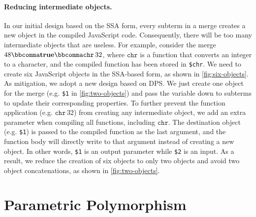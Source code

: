 \paragraph{Reducing intermediate objects.}
In our initial design based on the SSA form, every subterm in a merge creates a
new object in the compiled JavaScript code. Consequently, there will be too many
intermediate objects that are useless. For example, consider the merge
$48  \bbcomma   \mathbf{true}   \bbcomma   \mathtt{chr}  \, 32$, where $ \mathtt{chr} $ is a function that converts an
integer to a character, and the compiled function has been stored in
\lstinline{$chr}. We need to create six JavaScript objects in the SSA-based
form, as shown in \autoref{fig:six-objects}. As mitigation, we adopt a new
design based on DPS. We just create one object for the merge (e.g.
\lstinline{$1} in \autoref{fig:two-objects}) and pass the variable down to
subterms to update their corresponding properties. To further prevent the
function application (e.g. $ \mathtt{chr}  \, 32$) from creating any intermediate object,
we add an extra parameter when compiling all functions, including $ \mathtt{chr} $. The
destination object (e.g. \lstinline{$1}) is passed to the compiled function as
the last argument, and the function body will directly write to that argument
instead of creating a new object. In other words, \lstinline{$1} is an output
parameter while \lstinline{$2} is an input. As a result, we reduce the creation
of six objects to only two objects and avoid two object concatenations, as shown
in \autoref{fig:two-objects}.

\section{Parametric Polymorphism} \label{sec:poly}

